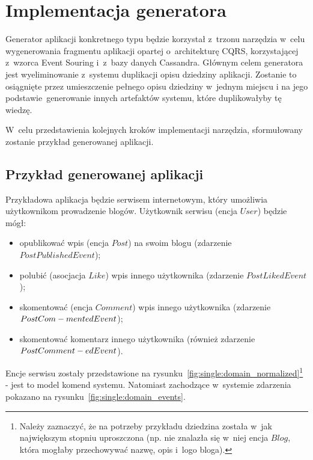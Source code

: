 \chapter{Implementacja generatora} \label{chap:implementation:single_type}

Generator aplikacji konkretnego typu będzie korzystał z~trzonu narzędzia w~celu wygenerowania fragmentu aplikacji opartej o~architekturę CQRS, korzystającej z~wzorca Event Souring i~z~bazy danych Cassandra.
Głównym celem generatora jest wyeliminowanie z~systemu duplikacji opisu dziedziny aplikacji.
Zostanie to osiągnięte przez umieszczenie pełnego opisu dziedziny w~jednym miejscu i na jego podstawie~generowanie innych artefaktów systemu, które duplikowałyby tę wiedzę.

W~celu przedstawienia kolejnych kroków implementacji narzędzia, sformułowany zostanie przykład generowanej aplikacji.



\section{Przykład generowanej aplikacji} \label{sec:sample_app}

Przykładowa aplikacja będzie serwisem internetowym, który umożliwia użytkownikom prowadzenie blogów.
Użytkownik serwisu (encja $User$) będzie mógł:

\begin{itemize}
 \item opublikować wpis (encja $Post$) na swoim blogu (zdarzenie $PostPublishedEvent$);
 \item polubić (asocjacja $Like$) wpis innego użytkownika (zdarzenie $PostLikedEvent$);
 \item skomentować (encja $Comment$) wpis innego użytkownika (zdarzenie $PostCom-\\mentedEvent$);
 \item skomentować komentarz innego użytkownika (również zdarzenie $PostComment-\\edEvent$).
\end{itemize}

Encje serwisu zostały przedstawione na rysunku~\ref{fig:single:domain_normalized}\footnote{Należy zaznaczyć, że na potrzeby przykładu dziedzina została w~jak największym stopniu uproszczona (np. nie znalazła się w~niej encja $Blog$, która mogłaby przechowywać nazwę, opis i~logo bloga).} - jest to model komend systemu.
Natomiast zachodzące w~systemie zdarzenia pokazano na rysunku~\ref{fig:single:domain_events}.

